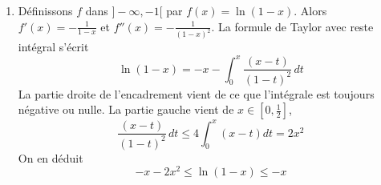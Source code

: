 \begin{enumerate}
\begin{enumerate}
 \item Définissons $f$ dans $]-\infty, -1[$ par $f(x) = \ln(1-x)$. Alors $f'(x)=-\frac{1}{1-x}$ et $f''(x)=-\frac{1}{(1-x)^2}$. La formule de Taylor avec reste intégral s'écrit
\begin{displaymath}
 \ln(1-x) = -x - \int_0^x \frac{(x-t)}{(1-t)^2}\,dt
\end{displaymath}
La partie droite de l'encadrement vient de ce que l'intégrale est toujours négative ou nulle. La partie gauche vient de $x\in[0,\frac{1}{2}]$,
\begin{displaymath}
\frac{(x-t)}{(1-t)^2}\,dt \leq 4 \int_0^x(x-t)dt = 2 x^2
\end{displaymath}
On en déduit
\begin{displaymath}
 -x-2x^2\leq \ln(1-x) \leq -x
\end{displaymath}


\end{enumerate}
\end{enumerate}
